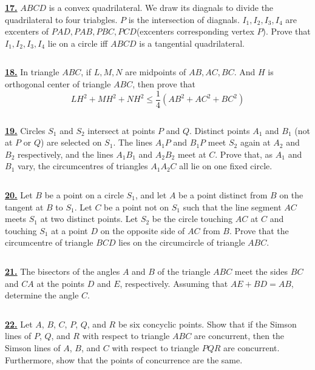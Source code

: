 \documentclass{article}
\begin{document}
$$ $$

\href{http://www.artofproblemsolving.com/Forum/viewtopic.php?p=638185#p638185}{\bf 17.} $ABCD$ is a convex quadrilateral. We draw its diagnals to divide the quadrilateral to four triabgles. $P$ is the intersection of diagnals. $I_{1},I_{2},I_{3},I_{4}$ are excenters of $PAD,PAB,PBC,PCD$(excenters corresponding vertex $P$). Prove that $I_{1},I_{2},I_{3},I_{4}$ lie on a circle iff $ABCD$ is a tangential quadrilateral.

$$ $$

\href{http://www.artofproblemsolving.com/Forum/viewtopic.php?p=634198#p634198}{\bf 18.} In triangle $ABC$, if $L,M,N$ are midpoints of $AB,AC,BC$. And $H$ is orthogonal center of triangle $ABC$, then prove that $$LH^{2}+MH^{2}+NH^{2}\leq \frac{1}{4}(AB^{2}+AC^{2}+BC^{2})$$

$$ $$

\href{http://www.artofproblemsolving.com/Forum/viewtopic.php?p=118673#p118673}{\bf 19.} Circles $S_1$ and $S_2$ intersect at points $P$ and $Q$. Distinct points $A_1$ and $B_1$ (not at $P$ or $Q$) are selected on $S_1$. The lines $A_1P$ and $B_1P$ meet $S_2$ again at $A_2$ and $B_2$ respectively, and the lines $A_1B_1$ and $A_2B_2$ meet at $C$.  Prove that, as $A_1$ and $B_1$ vary, the circumcentres of triangles $A_1A_2C$ all lie on one fixed circle.

$$ $$

\href{http://www.artofproblemsolving.com/Forum/viewtopic.php?p=118667#p118667}{\bf 20.} Let $B$ be a point on a circle $S_1$, and let $A$ be a point distinct from $B$ on the tangent at $B$ to $S_1$. Let $C$ be a point not on $S_1$ such that the line segment $AC$ meets $S_1$ at two distinct points. Let $S_2$ be the circle touching $AC$ at $C$ and touching $S_1$ at a point $D$ on the opposite side of $AC$ from $B$.  Prove that the circumcentre of triangle $BCD$ lies on the circumcircle of triangle $ABC$.

$$ $$

\href{http://www.artofproblemsolving.com/Forum/viewtopic.php?p=2126712#p2126712}{\bf 21.} The bisectors of the angles $A$ and $B$ of the triangle $ABC$ meet the sides $BC$ and $CA$ at the points $D$ and $E$, respectively. Assuming that $AE+BD=AB$, determine the angle $C$.

$$ $$

\href{http://www.artofproblemsolving.com/Forum/viewtopic.php?p=2117909#p2117909}{\bf 22.} Let $A$, $B$, $C$, $P$, $Q$, and $R$ be six concyclic points.  Show that if the Simson lines of $P$, $Q$, and $R$ with respect to triangle $ABC$ are concurrent, then the Simson lines of $A$, $B$, and $C$ with respect to triangle $PQR$ are concurrent.  Furthermore, show that the points of concurrence are the same.
\end{document}
